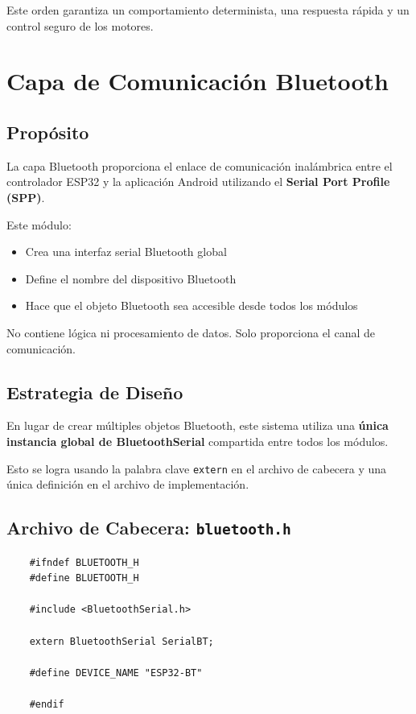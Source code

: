 \documentclass[12pt,a4paper]{article}
\newcommand{\ardfnDG}[1]{\texttt{\textcolor{arduinoTeal}{#1}}}
\begin{document}
Este orden garantiza un comportamiento determinista, una respuesta rápida
y un control seguro de los motores.

\section{Capa de Comunicación Bluetooth}

\subsection{Propósito}

La capa Bluetooth proporciona el enlace de comunicación inalámbrica entre el
controlador ESP32 y la aplicación Android utilizando el
\textbf{Serial Port Profile (SPP)}.

Este módulo:

\begin{itemize}
	\item Crea una interfaz serial Bluetooth global
	\item Define el nombre del dispositivo Bluetooth
	\item Hace que el objeto Bluetooth sea accesible desde todos los módulos
\end{itemize}

No contiene lógica ni procesamiento de datos.
Solo proporciona el canal de comunicación.

\subsection{Estrategia de Diseño}

En lugar de crear múltiples objetos Bluetooth, este sistema utiliza una
\textbf{única instancia global de BluetoothSerial} compartida entre todos
los módulos.

Esto se logra usando la palabra clave \texttt{extern} en el archivo de cabecera
y una única definición en el archivo de implementación.

\subsection{Archivo de Cabecera: \ardfnDG{bluetooth.h}}

\begin{lstlisting}
	#ifndef BLUETOOTH_H
	#define BLUETOOTH_H
	
	#include <BluetoothSerial.h>
	
	extern BluetoothSerial SerialBT;
	
	#define DEVICE_NAME "ESP32-BT"
	
	#endif
\end{lstlisting}
\end{document}
